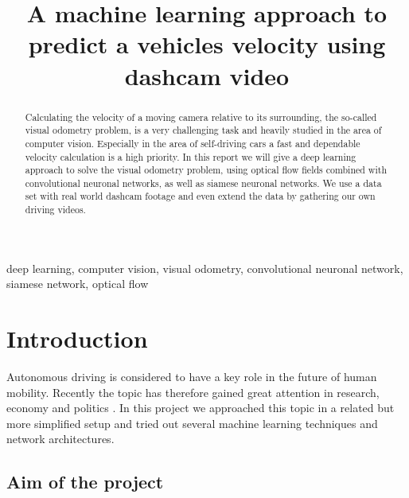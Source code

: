 \documentclass[conference]{IEEEtran}
\begin{document}
\title{A machine learning approach to predict a vehicles velocity using dashcam video}

\author{
\and
{}
}

\maketitle

\begin{abstract}
Calculating the velocity of a moving camera relative to its surrounding, the so-called visual odometry 
problem, is a very challenging task and heavily studied in the area of computer vision. Especially
in the area of self-driving cars a fast and dependable velocity calculation is a high priority.
In this report we will give a deep learning approach to solve the visual odometry problem, using 
optical flow fields combined with convolutional neuronal networks, as well as siamese neuronal networks.
We use a data set with real world dashcam footage and even extend the data by gathering our own
driving videos.
\end{abstract}

\begin{IEEEkeywords}
deep learning, computer vision, visual odometry, convolutional neuronal network, siamese network,
optical flow
\end{IEEEkeywords}

\section{Introduction}

Autonomous driving is considered to have a key role in the future of human mobility. Recently the topic has therefore gained great attention in research, economy and politics \cite{Maurer2016}. In this project we approached this topic in a related but more simplified setup and tried out several machine learning techniques and network architectures.

\subsection{Aim of the project}
\label{subsec:AimAndMeasure}
\end{document}
